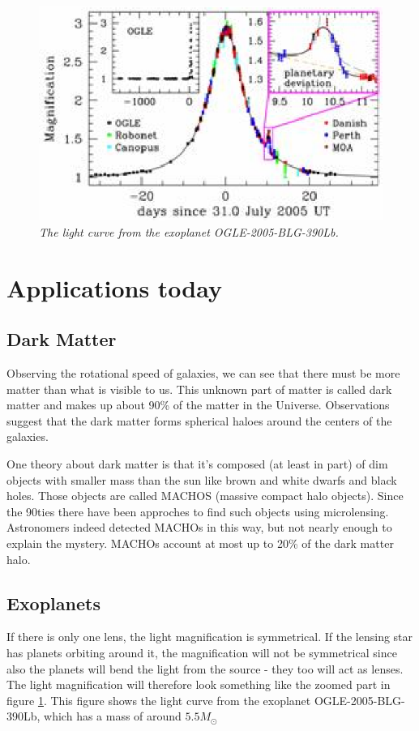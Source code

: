 \documentclass[12pt,a4paper,oneside]{scrartcl}
\begin{document}
\begin{figure}[p]
\centering
\includegraphics[width=0.5 \textwidth]{LightCurve_OGLE2005BLG390Lb}
\caption{\emph{The light curve from the exoplanet OGLE-2005-BLG-390Lb.}\label{fig:LightCurve}}
\end{figure}



\section{Applications today}

\subsection{Dark Matter}
Observing the rotational speed of galaxies, we can see that there must be more matter than what is visible to us. This unknown part of matter is called dark matter and makes up about 90\% of the matter in the Universe. Observations suggest that the dark matter forms  spherical haloes around the centers of the galaxies.

One theory about dark matter is that it's composed (at least in part) of dim objects with smaller mass than the sun like brown and white dwarfs and black holes. Those objects are called MACHOS (massive compact halo objects). Since the 90ties there have been approches to find such objects using microlensing. Astronomers indeed detected MACHOs in this way, but not nearly enough to explain the mystery. MACHOs account at most up to 20\% of the dark matter halo.

\subsection{Exoplanets}
If there is only one lens, the light magnification is symmetrical. If the lensing star has planets orbiting around it, the magnification will not be symmetrical since also the planets will bend the light from the source - they too will act as lenses. The light magnification will therefore look something like the zoomed part in figure \ref{fig:LightCurve}. This figure shows the light curve from the exoplanet OGLE-2005-BLG-390Lb, which has a mass of around $5.5M_{\odot}$
\end{document}
